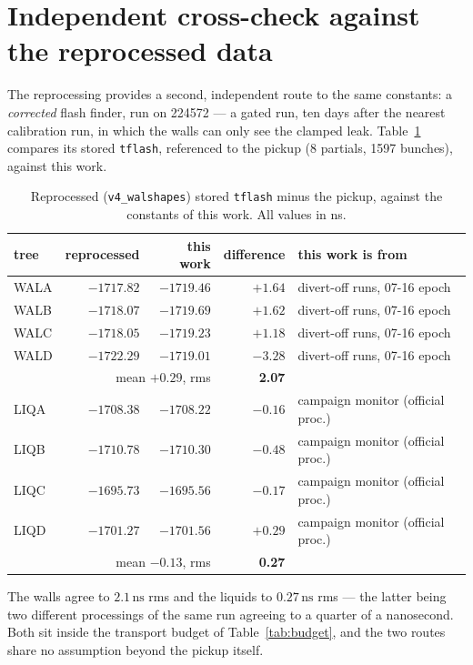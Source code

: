 \documentclass[11pt,a4paper]{article}
\newcommand{\ns}{\,\mathrm{ns}}
\begin{document}
\section{Independent cross-check against the reprocessed data}

The reprocessing provides a second, independent route to the same constants: a
\emph{corrected} flash finder, run on 224572 --- a gated run, ten days after the
nearest calibration run, in which the walls can only see the clamped leak.
Table~\ref{tab:xval} compares its stored \texttt{tflash}, referenced to the
pickup (8 partials, 1597 bunches), against this work.

\begin{table}[htbp]
\centering
\small
\caption{Reprocessed (\texttt{v4\_walshapes}) stored \texttt{tflash} minus the
pickup, against the constants of this work. All values in ns.}
\label{tab:xval}
\begin{tabular}{lrrrl}
\toprule
tree & reprocessed & this work & difference & this work is from \\
\midrule
WALA & $-1717.82$ & $-1719.46$ & $+1.64$ & divert-off runs, 07-16 epoch \\
WALB & $-1718.07$ & $-1719.69$ & $+1.62$ & divert-off runs, 07-16 epoch \\
WALC & $-1718.05$ & $-1719.23$ & $+1.18$ & divert-off runs, 07-16 epoch \\
WALD & $-1722.29$ & $-1719.01$ & $-3.28$ & divert-off runs, 07-16 epoch \\
\multicolumn{3}{r}{mean $+0.29$, rms} & \textbf{2.07} & \\
\midrule
LIQA & $-1708.38$ & $-1708.22$ & $-0.16$ & campaign monitor (official proc.) \\
LIQB & $-1710.78$ & $-1710.30$ & $-0.48$ & campaign monitor (official proc.) \\
LIQC & $-1695.73$ & $-1695.56$ & $-0.17$ & campaign monitor (official proc.) \\
LIQD & $-1701.27$ & $-1701.56$ & $+0.29$ & campaign monitor (official proc.) \\
\multicolumn{3}{r}{mean $-0.13$, rms} & \textbf{0.27} & \\
\bottomrule
\end{tabular}
\end{table}

The walls agree to $2.1\ns$ rms and the liquids to $0.27\ns$ rms --- the latter
being two different processings of the same run agreeing to a quarter of a
nanosecond. Both sit inside the transport budget of Table~\ref{tab:budget}, and
the two routes share no assumption beyond the pickup itself.
\end{document}

